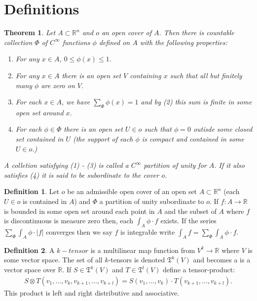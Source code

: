 \documentclass[20pt]{article}
\theoremstyle{plain}
\newtheorem{theorem}{Theorem}
\theoremstyle{definition}
\newtheorem{definition}{Definition}
\newcommand{\reals}{\mathbb{R}}
\begin{document}
\break



\section{Definitions}

\begin{theorem}
  Let $A \subset \reals^n$ and $o$ an open cover of $A$.
  Then there is countable collection $\Phi$ of $C^\infty$ 
  functions $\phi$ defined on $A$ with the following properties:
  \begin{enumerate}
    \item For any $x \in A$, $0 \leq \phi(x) \leq 1$.
    \item For any $x \in A$ there is an open set $V$ containing $x$ 
    such that all but finitely many $\phi$ are zero on $V$.
    \item For each $x \in A$, we have $\sum_\Phi \phi(x) = 1$ and 
    by (2) this sum is finite in some open set around $x$.
    \item For each $\phi \in \Phi$ there is an open set $U \in o$
    such that $\phi = 0$ outisde some closed set contained in $U$ 
    (the support of each $\phi$ is compact and contained in some 
    $U \in o$.)
  \end{enumerate}

  A colletion satisfying (1) - (3) is called a $C^\infty$ partition of unity for $A$.
  If it also satisfies (4) it is said to be subordinate to the cover $o$.
\end{theorem}

\vspace{2em}


\begin{definition}
  Let $o$ be an admissible open cover of an open set $A \subset \mathbb{R}^n$
  (each $U \in o$ is contained in $A$) and $\Phi$ a partition of unity 
  subordinate to $o$.  If $f: A \to \reals$ is bounded in some 
  open set around each point in $A$ and the subset of $A$ where $f$
  is discontinuous is measure zero then, each 
  $\int_A \phi \cdot f$ exists.
  If the series $\sum_\Phi \int_A \phi \cdot |f|$ converges 
  then we say $f$ is integrable write 
  $\int_A f = \sum_\Phi \int_A \phi \cdot f$.
\end{definition}

\vspace{3em}
\begin{definition}
  A $k-tensor$ is a multilinear map function from 
  $V^k \to \reals$ where $V$ is some vector space.
  The set of all $k$-tensors is denoted $\mathfrak{T}^k(V)$
  and becomes a is a vector space over $\mathbb{R}$.
  If $S \in \mathfrak{T}^k(V)$ and $T \in \mathfrak{T}^l(V)$
  define a tensor-product:
  \begin{align}
    S \otimes T (v_1, ..., v_k, v_{k+1}, ..., v_{k+l}) = 
    S(v_1, ..., v_k)\cdot T(v_{k+1}, ..., v_{k+l}).
  \end{align}
  This product is left and right distributive and associative.
\end{definition}
\end{document}
